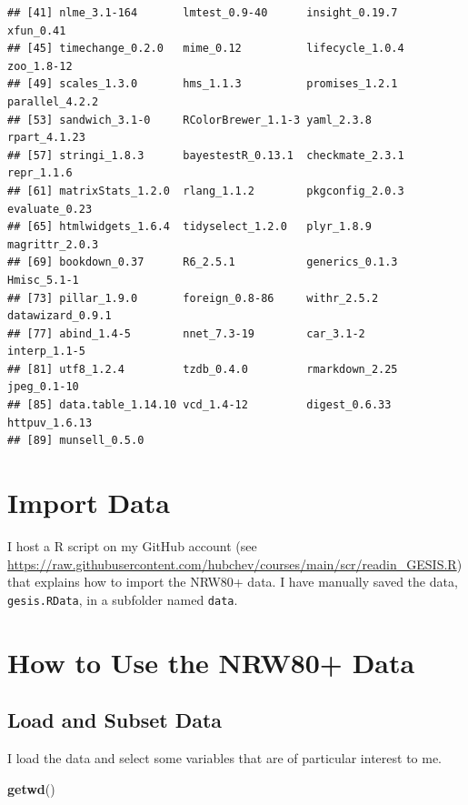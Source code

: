 \documentclass[
  doc]{apa6}
\newenvironment{Shaded}{\begin{snugshade}}{\end{snugshade}}
\newcommand{\FunctionTok}[1]{\textcolor[rgb]{0.13,0.29,0.53}{\textbf{#1}}}
\newcommand{\NormalTok}[1]{#1}
\begin{document}
\begin{verbatim}
## [41] nlme_3.1-164       lmtest_0.9-40      insight_0.19.7     xfun_0.41         
## [45] timechange_0.2.0   mime_0.12          lifecycle_1.0.4    zoo_1.8-12        
## [49] scales_1.3.0       hms_1.1.3          promises_1.2.1     parallel_4.2.2    
## [53] sandwich_3.1-0     RColorBrewer_1.1-3 yaml_2.3.8         rpart_4.1.23      
## [57] stringi_1.8.3      bayestestR_0.13.1  checkmate_2.3.1    repr_1.1.6        
## [61] matrixStats_1.2.0  rlang_1.1.2        pkgconfig_2.0.3    evaluate_0.23     
## [65] htmlwidgets_1.6.4  tidyselect_1.2.0   plyr_1.8.9         magrittr_2.0.3    
## [69] bookdown_0.37      R6_2.5.1           generics_0.1.3     Hmisc_5.1-1       
## [73] pillar_1.9.0       foreign_0.8-86     withr_2.5.2        datawizard_0.9.1  
## [77] abind_1.4-5        nnet_7.3-19        car_3.1-2          interp_1.1-5      
## [81] utf8_1.2.4         tzdb_0.4.0         rmarkdown_2.25     jpeg_0.1-10       
## [85] data.table_1.14.10 vcd_1.4-12         digest_0.6.33      httpuv_1.6.13     
## [89] munsell_0.5.0
\end{verbatim}

\hypertarget{import-data}{%
\section{Import Data}\label{import-data}}

I host a R script on my GitHub account (see \url{https://raw.githubusercontent.com/hubchev/courses/main/scr/readin_GESIS.R}) that explains how to import the NRW80+ data. I have manually saved the data, \texttt{gesis.RData}, in a subfolder named \texttt{data}.

\hypertarget{how-to-use-the-nrw80-data}{%
\section{How to Use the NRW80+ Data}\label{how-to-use-the-nrw80-data}}

\hypertarget{sec-load}{%
\subsection{Load and Subset Data}\label{sec-load}}

I load the data and select some variables that are of particular interest to me.

\begin{Shaded}
\begin{Highlighting}[]
\FunctionTok{getwd}\NormalTok{()}
\end{Highlighting}
\end{Shaded}
\end{document}
